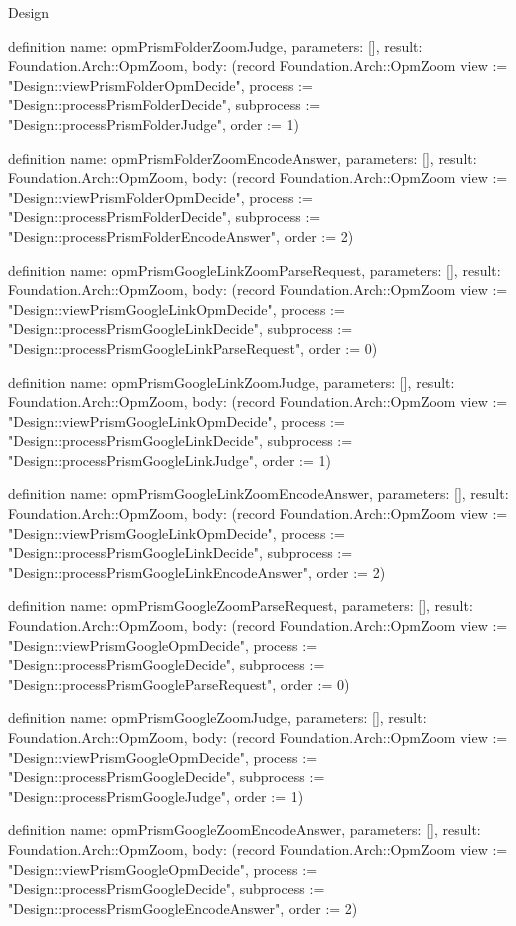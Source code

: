 \begin{lexlean}{Design}
\begin{semanticmodule}
definition{
  name: opmPrismFolderZoomJudge,
  parameters: [],
  result: Foundation.Arch::OpmZoom,
  body: (record Foundation.Arch::OpmZoom {view := "Design::viewPrismFolderOpmDecide", process := "Design::processPrismFolderDecide", subprocess := "Design::processPrismFolderJudge", order := 1})
}

definition{
  name: opmPrismFolderZoomEncodeAnswer,
  parameters: [],
  result: Foundation.Arch::OpmZoom,
  body: (record Foundation.Arch::OpmZoom {view := "Design::viewPrismFolderOpmDecide", process := "Design::processPrismFolderDecide", subprocess := "Design::processPrismFolderEncodeAnswer", order := 2})
}

definition{
  name: opmPrismGoogleLinkZoomParseRequest,
  parameters: [],
  result: Foundation.Arch::OpmZoom,
  body: (record Foundation.Arch::OpmZoom {view := "Design::viewPrismGoogleLinkOpmDecide", process := "Design::processPrismGoogleLinkDecide", subprocess := "Design::processPrismGoogleLinkParseRequest", order := 0})
}

definition{
  name: opmPrismGoogleLinkZoomJudge,
  parameters: [],
  result: Foundation.Arch::OpmZoom,
  body: (record Foundation.Arch::OpmZoom {view := "Design::viewPrismGoogleLinkOpmDecide", process := "Design::processPrismGoogleLinkDecide", subprocess := "Design::processPrismGoogleLinkJudge", order := 1})
}

definition{
  name: opmPrismGoogleLinkZoomEncodeAnswer,
  parameters: [],
  result: Foundation.Arch::OpmZoom,
  body: (record Foundation.Arch::OpmZoom {view := "Design::viewPrismGoogleLinkOpmDecide", process := "Design::processPrismGoogleLinkDecide", subprocess := "Design::processPrismGoogleLinkEncodeAnswer", order := 2})
}

definition{
  name: opmPrismGoogleZoomParseRequest,
  parameters: [],
  result: Foundation.Arch::OpmZoom,
  body: (record Foundation.Arch::OpmZoom {view := "Design::viewPrismGoogleOpmDecide", process := "Design::processPrismGoogleDecide", subprocess := "Design::processPrismGoogleParseRequest", order := 0})
}

definition{
  name: opmPrismGoogleZoomJudge,
  parameters: [],
  result: Foundation.Arch::OpmZoom,
  body: (record Foundation.Arch::OpmZoom {view := "Design::viewPrismGoogleOpmDecide", process := "Design::processPrismGoogleDecide", subprocess := "Design::processPrismGoogleJudge", order := 1})
}

definition{
  name: opmPrismGoogleZoomEncodeAnswer,
  parameters: [],
  result: Foundation.Arch::OpmZoom,
  body: (record Foundation.Arch::OpmZoom {view := "Design::viewPrismGoogleOpmDecide", process := "Design::processPrismGoogleDecide", subprocess := "Design::processPrismGoogleEncodeAnswer", order := 2})
}


\end{semanticmodule}
\end{lexlean}
